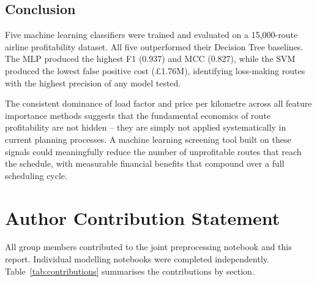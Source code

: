 \documentclass[12pt,a4paper]{article}
\begin{document}
\subsection{Conclusion}
\label{subsec:conclusion}

Five machine learning classifiers were trained and evaluated on a 15,000-route airline profitability dataset. All five outperformed their Decision Tree baselines. The MLP produced the highest F1 (0.937) and MCC (0.827), while the SVM produced the lowest false positive cost (£1.76M), identifying loss-making routes with the highest precision of any model tested.

The consistent dominance of load factor and price per kilometre across all feature importance methods suggests that the fundamental economics of route profitability are not hidden -- they are simply not applied systematically in current planning processes. A machine learning screening tool built on these signals could meaningfully reduce the number of unprofitable routes that reach the schedule, with measurable financial benefits that compound over a full scheduling cycle.

\section{Author Contribution Statement}
\label{sec:contributions}

All group members contributed to the joint preprocessing notebook and this report. Individual modelling notebooks were completed independently. Table~\ref{tab:contributions} summarises the contributions by section.
\end{document}
